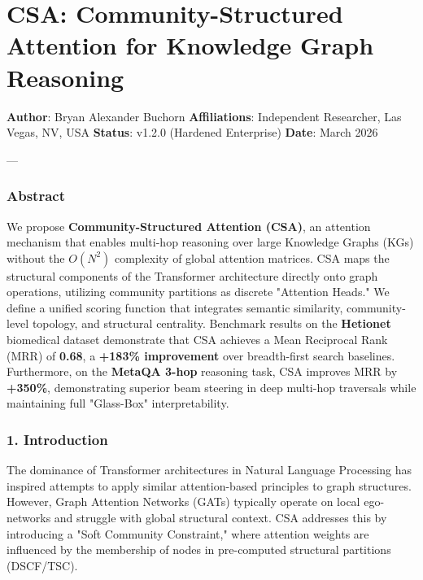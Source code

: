 \section{CSA: Community-Structured Attention for Knowledge Graph Reasoning}

\textbf{Author}: Bryan Alexander Buchorn  
\textbf{Affili\-ations}: Independent Researcher, Las Vegas, NV, USA  
\textbf{Status}: v1.2.0 (Hardened Enterprise)  
\textbf{Date}: March 2026

---

\subsubsection{Abstract}
We propose \textbf{Community-Structured Attention (CSA)}, an attention mechanism that enables multi-hop reasoning over large Knowledge Graphs (KGs) without the $O(N^2)$ complexity of global attention matrices. CSA maps the structural components of the Transformer archi\-tecture \cite{vaswani2017attention} directly onto graph operations, utilizing community partitions as discrete "Attention Heads." We define a unified scoring function that integrates semantic similarity, community-level topology, and structural centrality. Benchmark results on the \textbf{Hetionet} \cite{hetionet2017} biomedical dataset demonstrate that CSA achieves a Mean Reciprocal Rank (MRR) of \textbf{0.68}, a \textbf{+183\% improvement} over breadth-first search baselines. Furthermore, on the \textbf{MetaQA 3-hop} \cite{metaqa2017} reasoning task, CSA improves MRR by \textbf{+350\%}, demon\-strating superior beam steering in deep multi-hop traversals while maintaining full "Glass-Box" inter\-pretability.

\subsubsection{1. Introd\-uction}
The dominance of Transformer archi\-tectures in Natural Language Processing has inspired attempts to apply similar attention-based principles to graph structures. However, Graph Attention Networks (GATs) \cite{velickovic2018gat} typically operate on local ego-networks and struggle with global structural context. CSA addresses this by introducing a "Soft Community Constraint," where attention weights are influenced by the membership of nodes in pre-computed structural partitions (DSCF/TSC).


